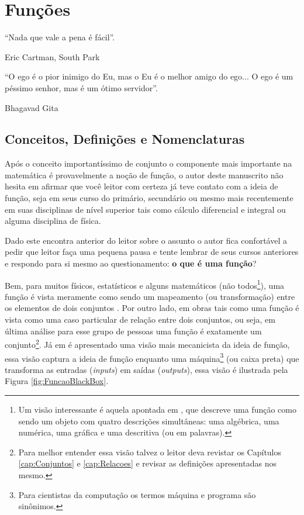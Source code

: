 \chapter{Funções}\label{cap:Funcoes}

\epigraph{``Nada que vale a pena é fácil''.}{Eric Cartman,  South Park}

\epigraph{``O ego é o pior inimigo do Eu, mas o Eu é o melhor amigo do ego... O ego é um péssimo senhor, mas é um ótimo servidor''.}{Bhagavad Gita}

\section{Conceitos, Definições e Nomenclaturas}\label{sec:FuncoesConceitoDefinicaoNomenclaturas}

Após o conceito importantíssimo de conjunto o componente mais importante na matemática é provavelmente a noção de função, o autor deste manuscrito não hesita em afirmar que você leitor com certeza já teve contato com a ideia de função, seja em seus curso do primário, secundário ou mesmo mais recentemente em suas disciplinas de nível superior tais como cálculo diferencial e integral ou alguma disciplina de física. 

Dado este encontra anterior do leitor sobre o assunto o autor fica confortável a pedir que leitor faça uma pequena pausa e tente lembrar de seus cursos anteriores e respondo para si mesmo ao questionamento: \textbf{o que é uma função}?

Bem, para muitos físicos, estatísticos e alguns matemáticos (não todos\footnote{Um visão interessante é aquela apontada em \cite{levin2021}, que descreve uma função como sendo um objeto com quatro descrições simultâneas: uma algébrica, uma numérica, uma gráfica e uma descritiva (ou em palavras).}), uma função é vista meramente como sendo um mapeamento (ou transformação) entre os elementos de dois conjuntos \cite{abe1991-TC}. Por outro lado, em obras tais como \cite{sussana2010-MD, lipschutz1971-Topo, lipschutz1978-TC, lipschutz2013-MD, Gerard2021discreta} uma função é vista como uma caso particular de relação entre dois conjuntos, ou seja, em última análise para esse grupo de pessoas uma função é exatamente um conjunto\footnote{Para melhor entender essa visão talvez o leitor deva revistar os Capítulos \ref{cap:Conjuntos} e \ref{cap:Relacoes} e revisar as definições apresentadas nos mesmo.}. Já em \cite{edward2019-MD, fmcbook} é apresentado uma visão mais mecanicista da ideia de função, essa visão captura a ideia de função enquanto uma máquina\footnote{Para cientistas da computação os termos máquina e programa são sinônimos.} (ou caixa preta) que transforma as entradas (\textit{inputs}) em saídas (\textit{outputs}), essa visão é ilustrada pela Figura \ref{fig:FuncaoBlackBox}. 

